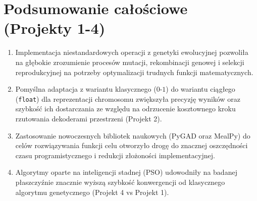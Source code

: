 \documentclass[12pt,a4paper]{article}
\begin{document}
\section{Podsumowanie całościowe (Projekty 1-4)}
\begin{enumerate}
    \item Implementacja niestandardowych operacji z genetyki ewolucyjnej pozwoliła na głębokie zrozumienie procesów mutacji, rekombinacji genowej i selekcji reprodukcyjnej na potrzeby optymalizacji trudnych funkcji matematycznych.
    \item Pomyślna adaptacja z wariantu klasycznego ($0$-$1$) do wariantu ciągłego (\texttt{float}) dla reprezentacji chromosomu zwiększyła precyzję wyników oraz szybkość ich dostarczania ze względu na odrzucenie kosztownego kroku rzutowania dekoderami przestrzeni (Projekt 2).
    \item Zastosowanie nowoczesnych bibliotek naukowych (PyGAD oraz MealPy) do celów rozwiązywania funkcji celu otworzyło drogę do znacznej oszczędności czasu programistycznego i redukcji złożoności implementacyjnej. 
    \item Algorytmy oparte na inteligencji stadnej (PSO) udowodniły na badanej płaszczyźnie znacznie wyższą szybkość konwergencji od klasycznego algorytmu genetycznego (Projekt 4 vs Projekt 1).
\end{enumerate}
\end{document}
